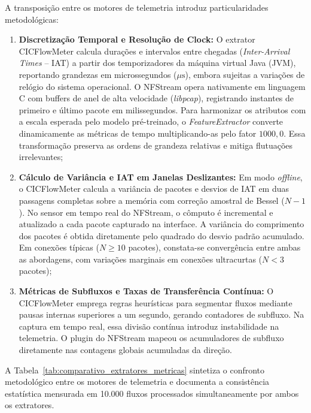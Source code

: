 A transposição entre os motores de telemetria introduz particularidades metodológicas:
\begin{enumerate}
    \item \textbf{Discretização Temporal e Resolução de Clock:}
    O extrator CICFlowMeter calcula durações e intervalos entre chegadas (\emph{Inter-Arrival Times} --
    IAT) a partir dos temporizadores da máquina virtual Java (JVM), reportando grandezas em
    microssegundos ($\mu\mathrm{s}$), embora sujeitas a variações de relógio do sistema operacional. O
    NFStream opera nativamente em linguagem C com buffers de anel de alta velocidade (\emph{libpcap}),
    registrando instantes de primeiro e último pacote em milissegundos. Para harmonizar os atributos com a
    escala esperada pelo modelo pré-treinado, o \emph{FeatureExtractor} converte dinamicamente as
    métricas de tempo multiplicando-as pelo fator $1000{,}0$. Essa transformação preserva as ordens de
    grandeza relativas e mitiga flutuações irrelevantes;
    
    \item \textbf{Cálculo de Variância e IAT em Janelas Deslizantes:}
    Em modo \emph{offline}, o CICFlowMeter calcula a variância de pacotes e desvios de IAT em duas
    passagens completas sobre a memória com correção amostral de Bessel ($N-1$). No sensor em tempo real
    do NFStream, o cômputo é incremental e atualizado a cada pacote capturado na interface. A variância do
    comprimento dos pacotes é obtida diretamente pelo quadrado do desvio padrão acumulado. Em conexões
    típicas ($N \ge 10$ pacotes), constata-se convergência entre ambas as abordagens, com variações
    marginais em conexões ultracurtas ($N < 3$ pacotes);
    
    \item \textbf{Métricas de Subfluxos e Taxas de Transferência Contínua:}
    O CICFlowMeter emprega regras heurísticas para segmentar fluxos mediante pausas internas superiores a
    um segundo, gerando contadores de subfluxo. Na captura em tempo real, essa divisão contínua introduz
    instabilidade na telemetria. O plugin do NFStream mapeou os acumuladores de subfluxo diretamente nas
    contagens globais acumuladas da direção.
\end{enumerate}

A Tabela~\ref{tab:comparativo_extratores_metricas} sintetiza o confronto metodológico entre os motores
de telemetria e documenta a consistência estatística mensurada em 10.000 fluxos processados
simultaneamente por ambos os extratores.

